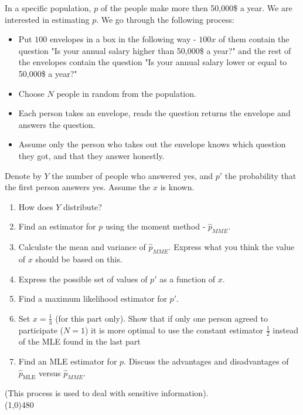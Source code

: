 \documentclass[../main.tex]{subfiles}
\begin{document}
\noindent In a specific population, $p$ of the people make more then 50,000\$ a year. We are interested in estimating $p$. We go through the following process:

\begin{itemize}

    \item Put $100$ envelopes in a box in the following way - $100x$ of them contain the question "Is your annual salary higher than 50,000\$ a year?" and the rest of the envelopes contain the question "Is your annual salary lower or equal to 50,000\$ a year?"
    
    \item Choose $N$ people in random from the population. 
    
    \item Each person takes an envelope, reads the question returns the envelope and answers the question. 
    
    \item Assume only the person who takes out the envelope knows which question they got, and that they answer honestly.
    
\end{itemize}

\noindent Denote by $Y$ the number of people who answered yes, and $p'$ the probability that the first person answers yes. Assume the $x$ is known. 

\begin{enumerate}
    
    \item How does $Y$ distribute?
    
    \item Find an estimator for $p$ using the moment method - $\hat{p}_{MME}$. 
    
    \item Calculate the mean and variance of $\hat{p}_{MME}$. Express what you think the value of $x$ should be based on this. 
    
    \item Express the possible set of values of $p'$ as a function of $x$. 
    
    \item Find a maximum likelihood estimator for $p'$.
    
    \item Set $x=\frac{1}{3}$ (for this part only). Show that if only one person agreed to participate ($N=1$) it is more optimal to use the constant estimator $\frac{1}{2}$ instead of the MLE found in the last part
    
    \item Find an MLE estimator for $p$. Discuss the advantages and disadvantages of $\hat{p}_{\text{MLE}}$ versus $\hat{p}_{MME}$.
    
\end{enumerate}
(This process is used to deal with sensitive information).\\
\noindent\line(1,0){480}
\end{document}
